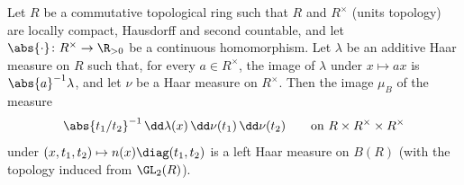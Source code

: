 Let $R$ be a commutative topological ring such that $R$ and $R^\times$ (units topology) are locally compact, Hausdorff
and second countable, and let $\abs{\cdot}\colon R^\times\to\R_{>0}$ be a continuous homomorphism. Let $\lambda$ be an
additive Haar measure on $R$ such that, for every $a\in R^\times$, the image of $\lambda$ under $x\mapsto ax$ is
$\abs{a}^{-1}\lambda$, and let $\nu$ be a Haar measure on $R^\times$. Then the image $\mu_B$ of the measure
\[
  \abs{t_1/t_2}^{-1}\,\dd\lambda(x)\,\dd\nu(t_1)\,\dd\nu(t_2)\qquad\text{on }R\times R^\times\times R^\times
\]
under $(x,t_1,t_2)\mapsto n(x)\diag(t_1,t_2)$ is a left Haar measure on $B(R)$ (with the topology induced from
$\GL_2(R)$).
